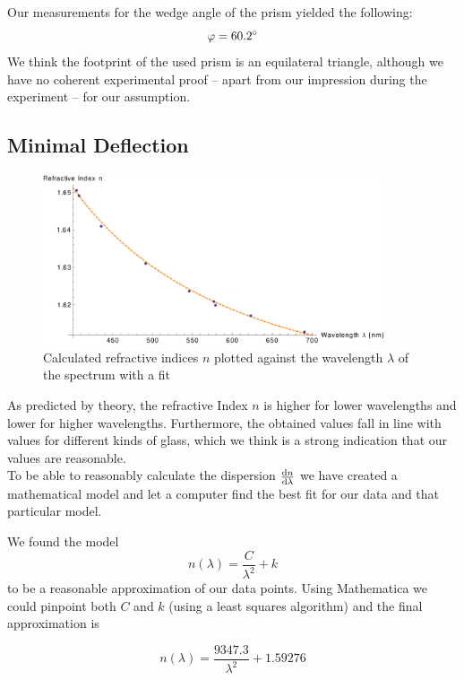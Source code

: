 \documentclass{scrreprt}
\renewcommand{\phi}{\varphi}
\begin{document}
Our measurements for the wedge angle of the prism yielded the following:
\begin{equation}
	\phi = \ang{60.2}
\notag
\end{equation}
We think the footprint of the used prism is an equilateral triangle, although we have no coherent experimental proof -- apart from our impression during the experiment --  for our assumption.

\subsection{Minimal Deflection}
\begin{figure}[H]
	\centering
  \includegraphics[width=0.9\textwidth]{diag/meas_and_fit.pdf}
	\caption{Calculated refractive indices $n$ plotted against the wavelength $\lambda$ of the spectrum with a fit}
	\label{fig:meas_and_fit}
\end{figure}
As predicted by theory, the refractive Index $n$ is higher for lower wavelengths and lower for higher wavelengths. Furthermore, the obtained values fall in line with values for different kinds of glass, which we think is a strong indication that our values are reasonable.\\

To be able to reasonably calculate the dispersion $\frac{\dif n}{\dif \lambda}$ we have created a mathematical model and let a computer find the best fit for our data and that particular model.

We found the model 
\begin{equation}
n (\lambda) = \frac{C}{\lambda^2}+k
\end{equation}
to be a reasonable approximation of our data points. Using Mathematica we could pinpoint both $C$ and $k$ (using a least squares algorithm) and the final approximation is

\begin{equation}\label{eq:approx}
n (\lambda) = \frac{9347.3}{\lambda^2}+1.59276
\end{equation} 
\end{document}
